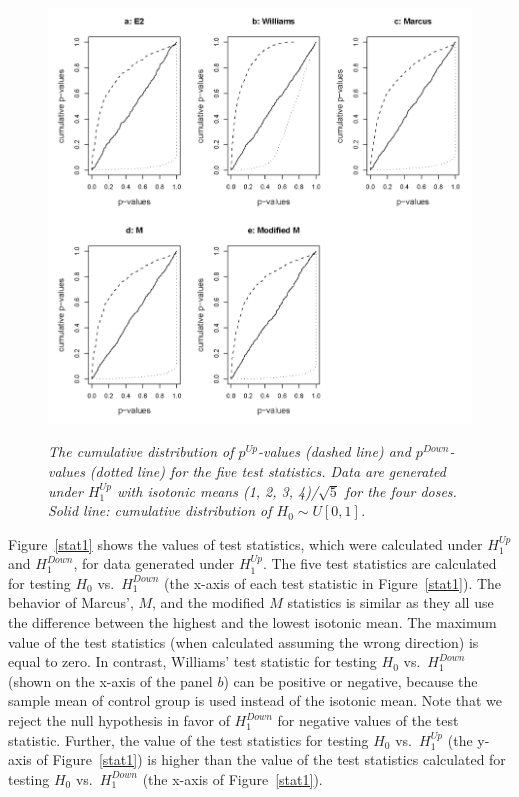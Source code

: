 \documentclass[10pt]{mybook4}
\begin{document}
\begin{figure}[!h]
\centering
{\includegraphics[width=1\textwidth]{pupdn1b.png}}
\caption{\em{The cumulative distribution of $p^{Up}$-values (dashed
line) and $p^{Down}$-values (dotted line) for the five test
statistics. Data are generated under $H_1^{Up}$ with isotonic means
(1, 2, 3, 4)/$\sqrt{5}$ for the four doses. Solid line: cumulative
distribution of $H_0\sim U[0,1]$.}} \label{pupdn1}
\end{figure}


Figure~\ref{stat1} shows the values of test statistics, which were
calculated under $H^{Up}_1$ and $H^{Down}_1$, for data generated
under $H^{Up}_1$. The five test statistics are calculated for
testing $H_0$ vs.\ $H^{Down}_1$ (the x-axis of each test statistic
in Figure~\ref{stat1}). The behavior of Marcus', $M$, and the
modified $M$ statistics is similar as they all use the difference
between the highest and the lowest isotonic mean.
The maximum value of the test statistics (when calculated assuming
the wrong direction) is equal to zero. In contrast, Williams' test
statistic for testing $H_0$ vs.\ $H^{Down}_1$ (shown on the x-axis
of the panel $b$) can be positive or negative, because the sample
mean of control group is used instead of the isotonic mean. Note
that we reject the null hypothesis in favor of $H^{Down}_1$ for
negative values of the test statistic. Further, the value of the
test statistics for testing $H_0$ vs.\ $H^{Up}_1$ (the y-axis of
Figure~\ref{stat1}) is higher than the value of the test statistics
calculated for testing $H_0$ vs.\ $H^{Down}_1$ (the x-axis of
Figure~\ref{stat1}).
\end{document}
